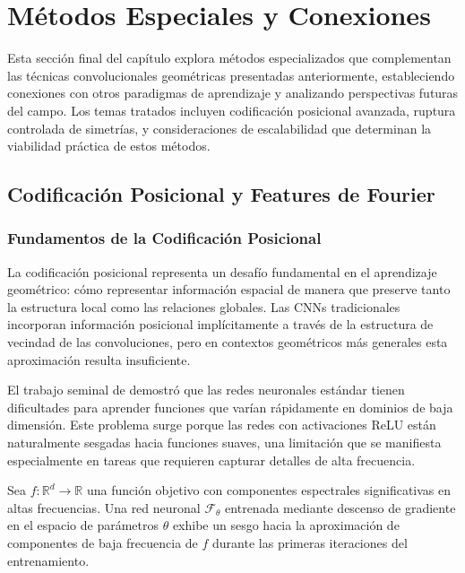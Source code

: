 \section{Métodos Especiales y Conexiones}\label{sec:special_methods}

Esta sección final del capítulo explora métodos especializados que complementan las técnicas convolucionales geométricas presentadas anteriormente, estableciendo conexiones con otros paradigmas de aprendizaje y analizando perspectivas futuras del campo. Los temas tratados incluyen codificación posicional avanzada, ruptura controlada de simetrías, y consideraciones de escalabilidad que determinan la viabilidad práctica de estos métodos.

\subsection{Codificación Posicional y Features de Fourier}

\subsubsection{Fundamentos de la Codificación Posicional}

La codificación posicional representa un desafío fundamental en el aprendizaje geométrico: cómo representar información espacial de manera que preserve tanto la estructura local como las relaciones globales. Las CNNs tradicionales incorporan información posicional implícitamente a través de la estructura de vecindad de las convoluciones, pero en contextos geométricos más generales esta aproximación resulta insuficiente.

El trabajo seminal de \citet{tancik2020fourier} demostró que las redes neuronales estándar tienen dificultades para aprender funciones que varían rápidamente en dominios de baja dimensión. Este problema surge porque las redes con activaciones \gls{ReLU} están naturalmente sesgadas hacia funciones suaves, una limitación que se manifiesta especialmente en tareas que requieren capturar detalles de alta frecuencia.

\begin{theorem}
Sea $f: \mathbb{R}^d \to \mathbb{R}$ una función objetivo con componentes espectrales significativas en altas frecuencias. Una red neuronal $\mathcal{F}_\theta$ entrenada mediante descenso de gradiente en el espacio de parámetros $\theta$ exhibe un sesgo hacia la aproximación de componentes de baja frecuencia de $f$ durante las primeras iteraciones del entrenamiento.
\end{theorem}

